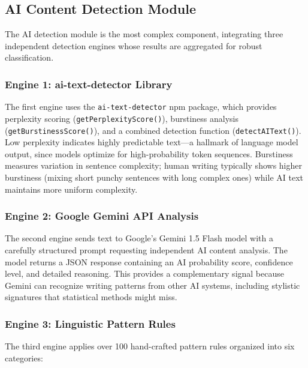 \documentclass[10pt,twocolumn]{article}
\begin{document}
\subsection{AI Content Detection Module}

The AI detection module is the most complex component, integrating three independent detection engines whose results are aggregated for robust classification.

\subsubsection{Engine 1: ai-text-detector Library}
The first engine uses the \texttt{ai-text-detector} npm package, which provides perplexity scoring (\texttt{getPerplexityScore()}), burstiness analysis (\texttt{getBurstinessScore()}), and a combined detection function (\texttt{detectAIText()}). Low perplexity indicates highly predictable text---a hallmark of language model output, since models optimize for high-probability token sequences. Burstiness measures variation in sentence complexity; human writing typically shows higher burstiness (mixing short punchy sentences with long complex ones) while AI text maintains more uniform complexity.

\subsubsection{Engine 2: Google Gemini API Analysis}
The second engine sends text to Google's Gemini 1.5 Flash model with a carefully structured prompt requesting independent AI content analysis. The model returns a JSON response containing an AI probability score, confidence level, and detailed reasoning. This provides a complementary signal because Gemini can recognize writing patterns from other AI systems, including stylistic signatures that statistical methods might miss.

\subsubsection{Engine 3: Linguistic Pattern Rules}
The third engine applies over 100 hand-crafted pattern rules organized into six categories:
\end{document}
